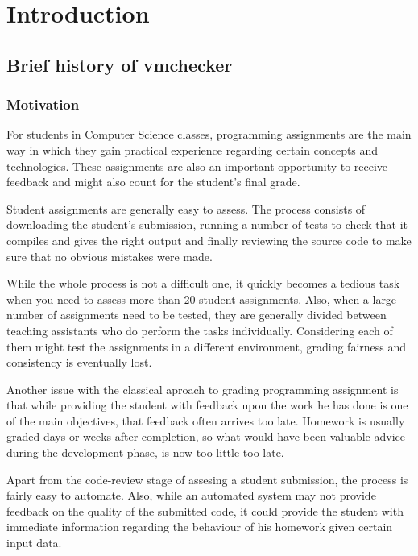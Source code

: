 \chapter{Introduction}
\label{chapter:intro}

\section{Brief history of vmchecker}
\label{sec:vmc-history}

\subsection{Motivation}
\label{sub-sec:vmc-history-motiv}

For students in Computer Science classes, programming assignments are the main
way in which they gain practical experience regarding certain concepts and 
technologies. These assignments are also an important opportunity to receive 
feedback and might also count for the student's final grade.

Student assignments are generally easy to assess. The process consists of 
downloading the student's submission, running a number of tests to check that 
it compiles and gives the right output and finally reviewing the source code
to make sure that no obvious mistakes were made.

While the whole process is not a difficult one, it quickly becomes a tedious task
when you need to assess more than 20 student assignments. Also, when a large number
of assignments need to be tested, they are generally divided between teaching 
assistants who do perform the tasks individually. Considering each of them might
test the assignments in a different environment, grading fairness and consistency
is eventually lost.

Another issue with the classical aproach to grading programming assignment is that
while providing the student with feedback upon the work he has done is one of the
main objectives, that feedback often arrives too late. Homework is usually graded
days or weeks after completion, so what would have been valuable advice during the
development phase, is now too little too late.

Apart from the code-review stage of assesing a student submission, the process is 
fairly easy to automate. Also, while an automated system may not provide feedback 
on the quality of the submitted code, it could provide the student with immediate
information regarding the behaviour of his homework given certain input data.

